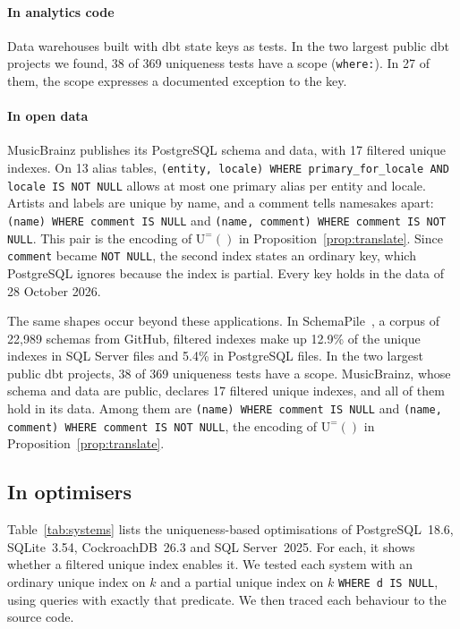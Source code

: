 \documentclass[conference]{IEEEtran}
\theoremstyle{definition}
\newcommand{\sql}[1]{\texttt{#1}}
\newcommand{\Ueq}[1]{\mathrm{U}^{=}(#1)}
\begin{document}
\paragraph*{In analytics code} Data warehouses built with dbt state keys as tests. In the two largest public dbt
projects we found, 38 of 369 uniqueness tests have a scope (\sql{where:}). In 27 of them, the scope expresses a
documented exception to the key.

\paragraph*{In open data} MusicBrainz publishes its PostgreSQL schema and data, with 17 filtered unique indexes. On
13 alias tables, \sql{(entity, locale) WHERE primary\_for\_locale AND locale IS NOT NULL} allows at most one primary
alias per entity and locale. Artists and labels are unique by name, and a comment tells namesakes apart: \sql{(name) WHERE comment IS
NULL} and \sql{(name, comment) WHERE comment IS NOT NULL}. This pair is the encoding of $\Ueq{}$ in
Proposition~\ref{prop:translate}. Since \sql{comment} became \sql{NOT NULL}, the second index states an ordinary key,
which PostgreSQL ignores because the index is partial. Every key holds in the data of 28 October 2026.

\else
The same shapes occur beyond these applications. In SchemaPile~\cite{SchemaPile}, a corpus of 22{,}989 schemas from
GitHub, filtered indexes make up 12.9\% of the unique indexes in SQL Server files and 5.4\% in PostgreSQL files. In the
two largest public dbt projects, 38 of 369 uniqueness tests have a scope. MusicBrainz, whose schema and data are
public, declares 17 filtered unique indexes, and all of them hold in its data. Among them are \sql{(name) WHERE comment
IS NULL} and \sql{(name, comment) WHERE comment IS NOT NULL}, the encoding of $\Ueq{}$ in
Proposition~\ref{prop:translate}.

\fi
\subsection{In optimisers}\label{sec:systems}

Table~\ref{tab:systems} lists the uniqueness-based optimisations of PostgreSQL~18.6, SQLite~3.54, CockroachDB~26.3
and SQL Server~2025. For each, it shows whether a filtered unique index enables it. We tested each system with an
ordinary unique index on $k$ and a partial unique index on $k$ \sql{WHERE d IS NULL}, using queries with exactly that
predicate. We then traced each behaviour to the source code.
\end{document}
